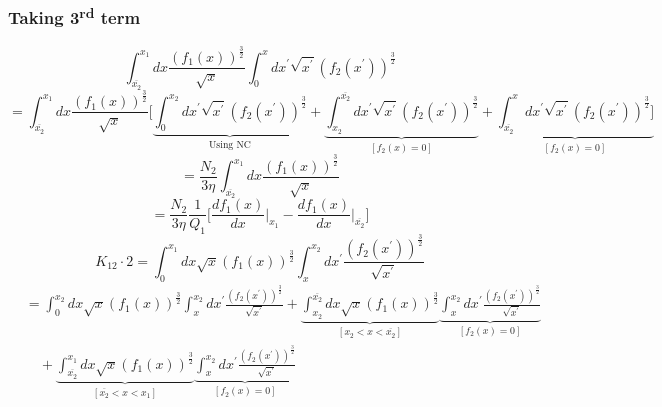 \documentclass[fleqn, 10pt]{article}
\begin{document}
\subsubsection*{Taking 3\textsuperscript{rd} term}
\begin{equation}
    \int^{x_{1}}_{\overline{x_{2}}} dx \frac{(f_{1}(x))^\frac{3}{2}}{\sqrt{x}}\int^{x}_{0} dx^\prime \sqrt{x^\prime} (f_{2}(x^\prime))^\frac{3}{2}
\end{equation}
\begin{equation*}
    =\int^{x_{1}}_{\overline{x_{2}}}dx \frac{(f_{1}(x))^\frac{3}{2}}{\sqrt{x}} \biggl[ \underbrace{\int^{x_{2}}_{0} dx^\prime \sqrt{x^\prime} (f_{2}(x^\prime))^\frac{3}{2}}_{\text{Using NC}} + \underbrace{\int^{\overline{x_{2}}}_{x_{2}}dx^\prime \sqrt{x^\prime}(f_{2}(x^\prime))^\frac{3}{2}}_{[f_{2}(x) = 0]} + \underbrace{ \int^{x}_{\overline{x_{2}}}dx^\prime \sqrt{x^\prime} (f_{2}(x^\prime))^\frac{3}{2}\biggr]}_{[f_{2}(x) = 0]}
\end{equation*}
\begin{equation*}
    = \frac{N_{2}}{3\eta} \int^{x_{1}}_{\overline{x_{2}}} dx \frac{(f_{1}(x))^\frac{3}{2}}{\sqrt{x}}
\end{equation*}
\begin{equation*}
    = \frac{N_{2}}{3\eta} \frac{1}{Q_{1}} \biggl[ \frac{df_{1}(x)}{dx}\biggr|_{x_{1}} - \frac{df_{1}(x)}{dx}\biggr|_{\overline{x_{2}}}\biggr]
\end{equation*}
\begin{equation*}
    K_{12}\cdot2 = \int^{x_{1}}_{0} dx \sqrt{x} (f_{1}(x))^\frac{3}{2} \int^{x_{2}}_{x} dx^\prime \frac{(f_{2}(x^\prime))^\frac{3}{2}}{\sqrt{x^\prime}}
\end{equation*}
\begin{equation*}
\begin{split}
    & = \int^{x_{2}}_{0} dx \sqrt{x} (f_{1}(x))^\frac{3}{2} \int^{x_{2}}_{x} dx^\prime \frac{(f_{2}(x^\prime))^\frac{3}{2}}{\sqrt{x^\prime}} + \underbrace{\int^{\overline{x_{2}}}_{x_{2}}dx \sqrt{x} (f_{1}(x))^\frac{3}{2}}_{[x_{2}<x<\overline{x_{2}}]} \underbrace{\int^{x_{2}}_{x} dx^\prime \frac{(f_{2}(x^\prime))^\frac{3}{2}}{\sqrt{x^\prime}}}_{[f_{2}(x) =0]} \\ & \quad + \underbrace{ \int^{x_{1}}_{\overline{x_{2}}} dx \sqrt{x} (f_{1}(x))^\frac{3}{2}}_{[\overline{x_{2}}<x<x_{1}]} \underbrace{\int^{x_{2}}_{x} dx^\prime \frac{(f_{2}(x^\prime))^\frac{3}{2}}{\sqrt{x^\prime}}}_{[f_{2}(x) = 0 ]}
    \end{split}
\end{equation*}
\end{document}
